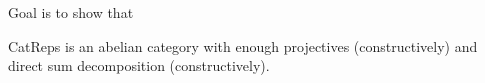 Goal is to show that

CatReps is an abelian category with enough projectives (constructively) and direct sum decomposition (constructively).